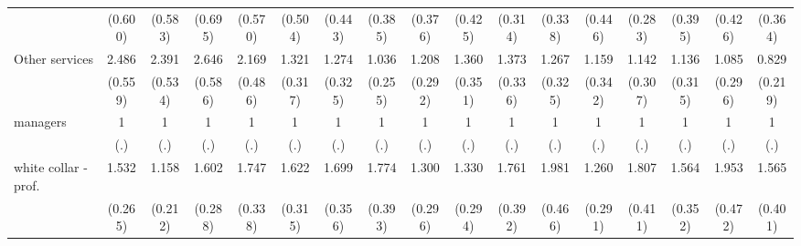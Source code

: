 {\begin{tabular}{l*{16}{c}}
                    &     (0.600)         &     (0.583)         &     (0.695)         &     (0.570)         &     (0.504)         &     (0.443)         &     (0.385)         &     (0.376)         &     (0.425)         &     (0.314)         &     (0.338)         &     (0.446)         &     (0.283)         &     (0.395)         &     (0.426)         &     (0.364)         \\
[1em]
Other services      &       2.486\sym{***}&       2.391\sym{***}&       2.646\sym{***}&       2.169\sym{***}&       1.321         &       1.274         &       1.036         &       1.208         &       1.360         &       1.373         &       1.267         &       1.159         &       1.142         &       1.136         &       1.085         &       0.829         \\
                    &     (0.559)         &     (0.534)         &     (0.586)         &     (0.486)         &     (0.317)         &     (0.325)         &     (0.255)         &     (0.292)         &     (0.351)         &     (0.336)         &     (0.325)         &     (0.342)         &     (0.307)         &     (0.315)         &     (0.296)         &     (0.219)         \\
[1em]
managers            &           1         &           1         &           1         &           1         &           1         &           1         &           1         &           1         &           1         &           1         &           1         &           1         &           1         &           1         &           1         &           1         \\
                    &         (.)         &         (.)         &         (.)         &         (.)         &         (.)         &         (.)         &         (.)         &         (.)         &         (.)         &         (.)         &         (.)         &         (.)         &         (.)         &         (.)         &         (.)         &         (.)         \\
[1em]
white collar - prof.&       1.532\sym{*}  &       1.158         &       1.602\sym{**} &       1.747\sym{**} &       1.622\sym{*}  &       1.699\sym{*}  &       1.774\sym{**} &       1.300         &       1.330         &       1.761\sym{*}  &       1.981\sym{**} &       1.260         &       1.807\sym{**} &       1.564\sym{*}  &       1.953\sym{**} &       1.565         \\
                    &     (0.265)         &     (0.212)         &     (0.288)         &     (0.338)         &     (0.315)         &     (0.356)         &     (0.393)         &     (0.296)         &     (0.294)         &     (0.392)         &     (0.466)         &     (0.291)         &     (0.411)         &     (0.352)         &     (0.472)         &     (0.401)         \\

\end{tabular}}

